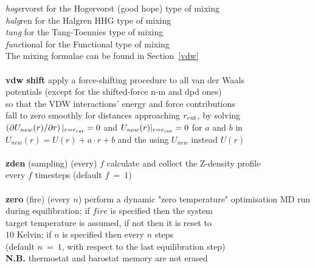 \begin{tabbing}
\>                                              \> \phantom{x} {\em hoge}rvorst for the Hogervorst (good hope) type of mixing \\
\>                                              \> \phantom{x} {\em halg}ren for the Halgren HHG type of mixing \\
\>                                              \> \phantom{x} {\em tang} for the Tang-Toennies type of mixing \\
\>                                              \> \phantom{x} {\em func}tional for the Functional type of mixing \\
\>                                              \> The mixing formulae can be found in Section~\ref{vdw} \\
\>                                              \> \\
\> {\bf vdw shift}                              \> apply a force-shifting procedure to all van der Waals \\
\>                                              \> potentials (except for the shifted-force n-m and dpd ones) \\
\>                                              \> so that the VDW interactions' energy and force contributions \\
\>                                              \> fall to zero smoothly for distances approaching $r_{\rm cut}$, by solving \\
\>                                              \> $\left(\partial U_{new}(r) / \partial r \right)|_{r = r_{\rm cut}} = 0$ and $U_{new}(r)|_{r=r_{\rm cut}}= 0$ for $a$ and $b$ in \\
\>                                              \> $U_{new}(r) = U(r) + a \cdot r + b$ and the using $U_{new}$ instead $U(r)$ \\
\>                                              \> \\
\> {\bf zden} (sampling) (every) $f$            \> calculate and collect the Z-density profile \\
\>                                              \> every $f$ timesteps (default $f~=~1$) \\
\>                                              \> \\
\> {\bf zero} (fire) (every $n$)                \> perform a dynamic "zero temperature" optimisation MD run \\
\>                                              \> during equilibration; if $fire$ is specified then the system \\
\>                                              \> target temperature is assumed, if not then it is reset to \\
\>                                              \> $10$ Kelvin; if $n$ is specified then every $n$ steps \\
\>                                              \> (default $n~=~1$, with respect to the last equilibration step) \\
\>                                              \> {\bf N.B.} thermostat and barostat memory are not erased
\end{tabbing}

